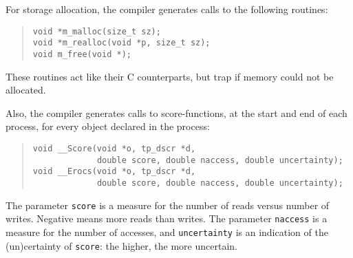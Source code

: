 \documentclass[10pt]{article}
\begin{document}
For storage allocation, the compiler generates calls to the following
routines:
\begin{quote}
\begin{verbatim}
void *m_malloc(size_t sz);
void *m_realloc(void *p, size_t sz);
void m_free(void *);
\end{verbatim}
\end{quote}
These routines act like their C counterparts, but trap if memory could not
be allocated.

Also, the compiler generates calls to score-functions, at the start
and end of each process, for every object declared in the process:
\begin{quote}
\begin{verbatim}
void __Score(void *o, tp_dscr *d,
             double score, double naccess, double uncertainty);
void __Erocs(void *o, tp_dscr *d,
             double score, double naccess, double uncertainty);
\end{verbatim}
\end{quote}
The parameter \verb+score+
is a measure for the number of reads versus
number of writes. Negative means more reads than writes.
The parameter \verb+naccess+ is a measure for the number of accesses,
and \verb+uncertainty+
is an indication of the (un)certainty of \verb+score+:
the higher, the more uncertain.
\end{document}
